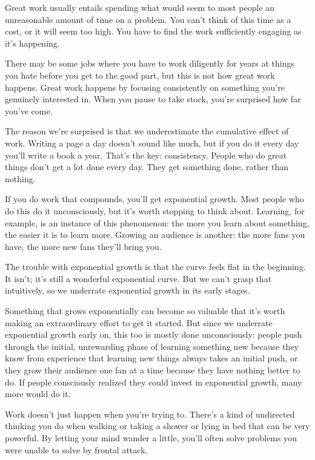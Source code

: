 \documentclass[12pt]{book}
\begin{document}
Great work usually entails spending what would seem to most people an
unreasonable amount of time on a problem. You can't think of this time
as a cost, or it will seem too high. You have to find the work
sufficiently engaging as it's happening.

There may be some jobs where you have to work diligently for years at
things you hate before you get to the good part, but this is not how
great work happens. Great work happens by focusing consistently on
something you're genuinely interested in. When you pause to take stock,
you're surprised how far you've come.

The reason we're surprised is that we underestimate the cumulative
effect of work. Writing a page a day doesn't sound like much, but if you
do it every day you'll write a book a year. That's the key: consistency.
People who do great things don't get a lot done every day. They get
something done, rather than nothing.

If you do work that compounds, you'll get exponential growth. Most
people who do this do it unconsciously, but it's worth stopping to think
about. Learning, for example, is an instance of this phenomenon: the
more you learn about something, the easier it is to learn more. Growing
an audience is another: the more fans you have, the more new fans
they'll bring you.

The trouble with exponential growth is that the curve feels flat in the
beginning. It isn't; it's still a wonderful exponential curve. But we
can't grasp that intuitively, so we underrate exponential growth in its
early stages.

Something that grows exponentially can become so valuable that it's
worth making an extraordinary effort to get it started. But since we
underrate exponential growth early on, this too is mostly done
unconsciously: people push through the initial, unrewarding phase of
learning something new because they know from experience that learning
new things always takes an initial push, or they grow their audience one
fan at a time because they have nothing better to do. If people
consciously realized they could invest in exponential growth, many more
would do it.

Work doesn't just happen when you're trying to. There's a kind of
undirected thinking you do when walking or taking a shower or lying in
bed that can be very powerful. By letting your mind wander a little,
you'll often solve problems you were unable to solve by frontal attack.
\end{document}
